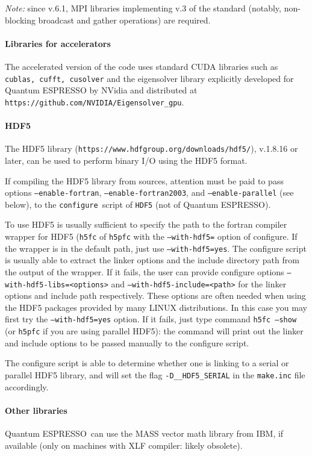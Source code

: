 \documentclass[12pt,a4paper]{article}
\def\qe{{\sc Quantum ESPRESSO}}
\def\configure{\texttt{configure}}
\begin{document}
{\em Note:} since v.6.1, MPI libraries implementing v.3 of the standard
(notably, non-blocking broadcast and gather operations) are required.

\paragraph{Libraries for accelerators}
The accelerated version of the code uses standard CUDA libraries such as
\texttt{cublas, cufft, cusolver} and the eigensolver library explicitly
developed for \qe{} by NVidia and distributed at \texttt{https://github.com/NVIDIA/Eigensolver\_gpu}.

\paragraph {HDF5}
The HDF5 library (\texttt{https://www.hdfgroup.org/downloads/hdf5/}),
v.1.8.16 or later, can be used to perform binary I/O using the HDF5
format.

If compiling the HDF5 library from sources, attention must be paid
to pass options \texttt{--enable-fortran},
\texttt{--enable-fortran2003}, and \texttt{--enable-parallel} (see below),
to the \configure{}ript of \texttt{HDF5} (not of \qe).

To use HDF5 is usually sufficient to specify the path to the fortran
compiler wrapper for HDF5 (\texttt{h5fc} of \texttt{h5pfc} with the
\texttt{--with-hdf5=} option of configure. If the wrapper is in the
default path, just use \texttt{--with-hdf5=yes}.
The configure script is usually able to extract the linker options
and the include directory path from the output of the wrapper. If it
fails, the user can provide configure options
\texttt{--with-hdf5-libs=<options>} and \texttt{--with-hdf5-include=<path>}
for the linker options and include path respectively.
These options are often needed when using the HDF5 packages
provided by many LINUX distributions. In this case you may first try
the \texttt{--with-hdf5=yes} option. If it fails, just type command
\texttt{h5fc --show} (or \texttt{h5pfc} if you are using parallel HDF5):
the command will print out the linker and include options to be passed
manually to the configure script.

The configure script is able to determine whether one is linking to a
serial or parallel HDF5 library, and will  set the flag
\texttt{-D\_\_HDF5\_SERIAL} in the \texttt{make.inc} file accordingly.


\paragraph{Other libraries}
\qe\ can use the MASS vector math
library from IBM, if available (only on machines with XLF compiler:
likely obsolete).
\end{document}
